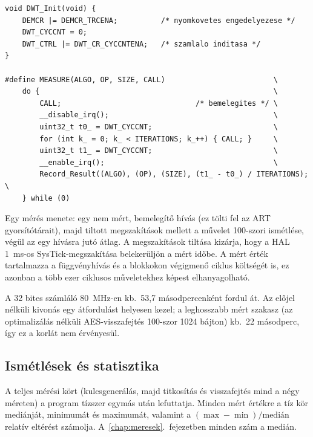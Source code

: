 \documentclass[a4paper,12pt]{report}
\theoremstyle{definition}
\theoremstyle{remark}
\begin{document}
\noindent\begin{minipage}{\textwidth}
\begin{verbatim}
void DWT_Init(void) {
    DEMCR |= DEMCR_TRCENA;          /* nyomkovetes engedelyezese */
    DWT_CYCCNT = 0;
    DWT_CTRL |= DWT_CR_CYCCNTENA;   /* szamlalo inditasa */
}

#define MEASURE(ALGO, OP, SIZE, CALL)                         \
    do {                                                      \
        CALL;                               /* bemelegites */ \
        __disable_irq();                                      \
        uint32_t t0_ = DWT_CYCCNT;                            \
        for (int k_ = 0; k_ < ITERATIONS; k_++) { CALL; }     \
        uint32_t t1_ = DWT_CYCCNT;                            \
        __enable_irq();                                       \
        Record_Result((ALGO), (OP), (SIZE), (t1_ - t0_) / ITERATIONS); \
    } while (0)
\end{verbatim}
\label{lst:dwt}
\end{minipage}

\medskip

Egy mérés menete: egy nem mért, bemelegítő hívás (ez tölti fel az ART gyorsítótárait), majd tiltott megszakítások mellett a művelet 100-szori ismétlése, végül az egy hívásra jutó átlag. A megszakítások tiltása kizárja, hogy a HAL 1~ms-os SysTick-megszakítása belekerüljön a mért időbe. A mért érték tartalmazza a függvényhívás és a blokkokon végigmenő ciklus költségét is, ez azonban a több ezer ciklusos műveletekhez képest elhanyagolható.

A 32 bites számláló 80~MHz-en kb.\ 53,7 másodpercenként fordul át. Az előjel nélküli kivonás egy átfordulást helyesen kezel; a leghosszabb mért szakasz (az optimalizálás nélküli AES-visszafejtés 100-szor 1024 bájton) kb.\ 22 másodperc, így ez a korlát nem érvényesül.

\subsection{Ismétlések és statisztika}

A teljes mérési kört (kulcsgenerálás, majd titkosítás és visszafejtés mind a négy méreten) a program tízszer egymás után lefuttatja. Minden mért értékre a tíz kör mediánját, minimumát és maximumát, valamint a $(\max - \min)/\mathrm{medián}$ relatív eltérést számolja. A~\ref{chap:meresek}.~fejezetben minden szám a medián.
\end{document}
